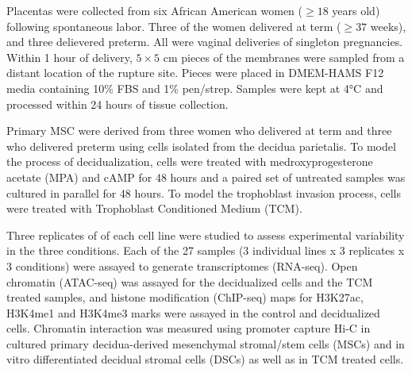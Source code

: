 Placentas were collected from six African American women (\(\geq 18\) years old) following spontaneous labor.
Three of the women delivered at term (\(\geq 37\) weeks), and three delievered preterm.
All were vaginal deliveries of singleton pregnancies. Within 1 hour of delivery, $5 \times 5$ cm pieces of the membranes were
sampled from a distant location of the rupture site. Pieces were placed in DMEM-HAMS F12 media containing 10\% FBS and
1\% pen/strep. Samples were kept at 4°C and processed within 24 hours of tissue collection.

Primary MSC were derived from three women who delivered at term and three who delivered preterm using cells isolated from the decidua parietalis.
To model the process of decidualization, cells were treated with medroxyprogesterone acetate (MPA)
and cAMP for 48 hours and a paired set of untreated samples was cultured in parallel for 48 hours.
To model the trophoblast invasion process, cells were treated with Trophoblast Conditioned Medium (TCM).

Three replicates of of each cell line were studied to assess experimental variability in the three conditions.
Each of the 27 samples (3 individual lines x 3 replicates x 3 conditions) were assayed to generate transcriptomes (RNA-seq).
Open chromatin (ATAC-seq) was assayed for the decidualized cells and the TCM treated samples,
and histone modification (ChIP-seq) maps for H3K27ac, H3K4me1 and H3K4me3 marks were assayed in the control and decidualized cells.
Chromatin interaction was measured using promoter capture Hi-C in cultured primary decidua-derived mesenchymal stromal/stem cells (MSCs)
and in vitro differentiated decidual stromal cells (DSCs) as well as in TCM treated cells.





